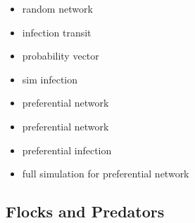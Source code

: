 \documentclass[12pt]{article}
\begin{document}
\singlespacing
\begin{itemize}

\item{\large random network}

\vspace{1cm}

\item{\large infection transit}

\vspace{1cm}

\item{\large probability vector}

\vspace{1cm}


\item{\large sim infection}

\vspace{1cm}

\item{\large preferential network}

\vspace{1cm}


\item{\large preferential network}

\vspace{1cm}


\item{\large preferential infection}

\vspace{1cm}


\item{\large full simulation for preferential network}

\vspace{1cm}


\end{itemize}




\subsection{Flocks and Predators}
\end{document}
